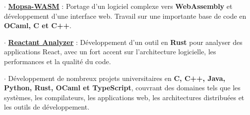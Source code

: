 \documentclass[10pt,A4]{article}
\begin{document}
$\cdot$
\href{https://github.com/rboudrouss/mopsa-emcc}{\textbf{Mopsa-WASM}} :
Portage d'un logiciel complexe vers \textbf{WebAssembly} et développement d'une interface web. Travail sur une importante base de code en \textbf{OCaml, C et C++}.

\vspace{2pt}

$\cdot$
\href{https://github.com/rboudrouss/reactant-analyzer}{\textbf{Reactant Analyzer}} :
Développement d'un outil en \textbf{Rust} pour analyser des applications React, avec un fort accent sur l'architecture logicielle, les performances et la qualité du code.

\vspace{2pt}

$\cdot$
Développement de nombreux projets universitaires en \textbf{C, C++, Java, Python, Rust, OCaml et TypeScript}, couvrant des domaines tels que les systèmes, les compilateurs, les applications web, les architectures distribuées et les outils de développement.

\end{document}
